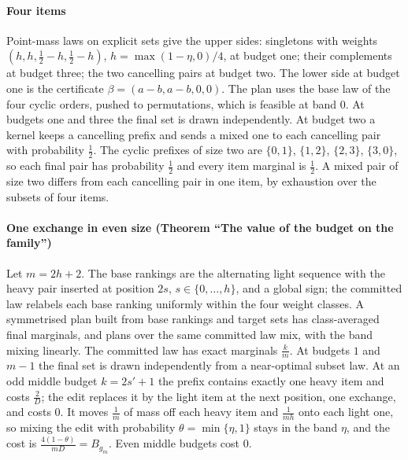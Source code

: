 \paragraph{Four items} Point-mass laws on explicit sets give the upper sides: singletons with
weights $(h,h,\frac12-h,\frac12-h)$, $h=\max(1-\eta,0)/4$, at budget one; their complements at
budget three; the two cancelling pairs at budget two. The lower side at budget one is the
certificate $\beta=(a-b,a-b,0,0)$. The plan uses the base law of the four cyclic orders, pushed
to permutations, which is feasible at band $0$. At budgets one and three the final set is drawn
independently. At budget two a kernel keeps a cancelling prefix and sends a mixed one to each
cancelling pair with probability $\frac12$. The cyclic prefixes of size two are $\{0,1\}$,
$\{1,2\}$, $\{2,3\}$, $\{3,0\}$, so each final pair has probability $\frac12$ and every item
marginal is $\frac12$. A mixed pair of size two differs from each cancelling pair in one item, by
exhaustion over the subsets of four items.

\paragraph{One exchange in even size (Theorem ``The value of the budget on the family'')} Let
$m=2h+2$. The base rankings are the alternating light sequence with the heavy pair inserted at
position $2s$, $s\in\{0,\dots,h\}$, and a global sign; the committed law relabels each base ranking
uniformly within the four weight classes. A symmetrised plan built from base rankings and target
sets has class-averaged final marginals, and plans over the same committed law mix, with the band
mixing linearly. The committed law has exact marginals $\frac km$. At budgets $1$ and $m-1$ the
final set is drawn independently from a near-optimal subset law. At an odd middle budget
$k=2s'+1$ the prefix contains exactly one heavy item and costs $\frac2D$; the edit replaces it by
the light item at the next position, one exchange, and costs $0$. It moves $\frac1m$ of mass off
each heavy item and $\frac1{mh}$ onto each light one, so mixing the edit with probability
$\theta=\min\{\eta,1\}$ stays in the band $\eta$, and the cost is $\frac{4(1-\theta)}{mD}=B_{g_m}$. Even
middle budgets cost $0$.

